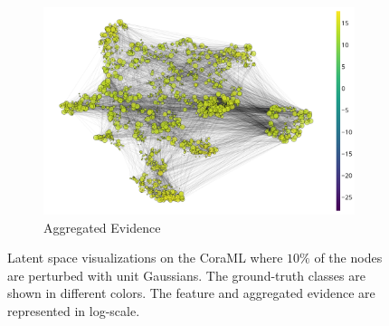 \begin{figure}[!h]
\begin{subfigure}[t]{\textwidth}
	\end{subfigure}
	\begin{subfigure}[t]{\textwidth}
	    \centering
		\includegraphics[height=0.25\textheight]{sections/009_neurips2021/resources/gaussian-evidence.png}
		\caption{Aggregated Evidence}
		\label{subfig:gaussian-clean-evidence}
	\end{subfigure}
    \caption{Latent space visualizations on the CoraML where $10\%$ of the nodes are perturbed with unit Gaussians. The ground-truth classes are shown in different colors. The feature and aggregated evidence are represented in log-scale.}
    \label{fig:latent-space-gaussian}
\end{figure}
%
